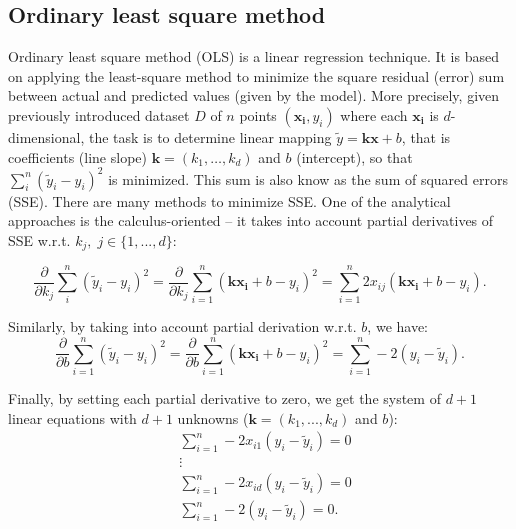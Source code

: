 \documentclass{bmcart}
\begin{document}
	\subsection{Ordinary least square method}\label{sec:ols}
Ordinary least square method (OLS) is a linear regression technique. It is based on applying the least-square method to minimize the square residual (error) sum  between actual and predicted values (given by the model). More precisely, given previously introduced dataset $D$ of $n$ points $(\mathbf{x_i}, y_i)$ where each $\mathbf{x_i}$ is $d$-dimensional, the task is to determine linear mapping $\tilde{y} = \mathbf{k} \mathbf{x} + b$, that is coefficients (line slope) $\mathbf{k} = (k_1, \ldots, k_d)$ and $b$ (intercept), so that $ \sum_{i}^{n} (\tilde{y}_i - y_i)^2 $ is minimized. This sum is also know as the sum of squared errors (SSE). There are many methods to minimize SSE. One of the analytical approaches is the calculus-oriented -- it takes into account partial derivatives of SSE w.r.t. $k_j,\; j \in \{1, ..., d\}$: 

$$  \frac{\partial}{\partial k_j} \sum_{i}^{n} (\tilde{y}_i - y_i)^2 = \frac{\partial}{\partial k_j} \sum_{i=1}^{n} ( \mathbf{k}\mathbf{x_i}+b  - y_i)^2 =  \sum_{i=1}^{n} 2x_{ij}(\mathbf{k}\mathbf{x_i} + b - y_i).$$ 

Similarly, by taking into account  partial derivation w.r.t. $b$, we have: 
$$  \frac{\partial}{\partial b} \sum_{i=1}^{n} (\tilde{y}_i - y_i)^2  = \frac{\partial}{\partial b} \sum_{i=1}^{n} ( \mathbf{k}\mathbf{x_i}+b  - y_i)^2 = \sum_{i=1}^{n} -2  (y_i - \tilde{y}_i). $$

Finally, by setting each partial derivative to zero, we get the system of $d+1$ linear equations with $d+1$ unknowns ($\mathbf{k}=(k_1, ..., k_d)$ and $b$): 
 \begin{align*}
	& \sum_{i=1}^{n} -2x_{i1} (y_i - \tilde{y}_i) = 0 \\
	& \vdots \\
	& \sum_{i=1}^{n} -2x_{id} (y_i - \tilde{y}_i) = 0 \\
	&\sum_{i=1}^{n} -2  (y_i - \tilde{y}_i) = 0.
\end{align*} 
 
\end{document}
